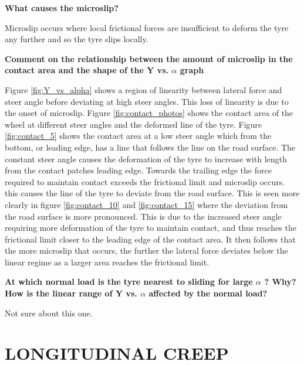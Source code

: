 \documentclass{article}
\begin{document}
\begin{center}
    \textbf{What causes the microslip?}
\end{center}
Microslip occurs where local frictional forces are insufficient to deform the tyre any further and so the tyre slips locally.

\begin{center}
    \textbf{Comment on the relationship between the amount of microslip in the contact area and
    the shape of the Y vs. $ \alpha $ graph}
\end{center}

Figure \ref{fig:Y_vs_alpha} shows a region of linearity between lateral force and steer angle before deviating at high steer angles.
This loss of linearity is due to the onset of microslip.
Figure \ref{fig:contact_photos} shows the contact area of the wheel at different steer angles and the deformed line of the tyre. %
Figure \ref{fig:contact_5} shows the contact area at a low steer angle which from the bottom, or leading edge, has a line that follows the line on the road surface.
The constant steer angle causes the deformation of the tyre to increase with length from the contact patches leading edge.
Towards the trailing edge the force required to maintain contact exceeds the frictional limit and microslip occurs.
this causes the line of the tyre to deviate from the road surface.
This is seen more clearly in figure \ref{fig:contact_10} and \ref{fig:contact_15} where the deviation from the road surface is more pronounced.
This is due to the increased steer angle requiring more deformation of the tyre to maintain contact, and thus reaches the frictional limit closer to the leading edge of the contact area.
It then follows that the more microslip that occurs, the further the lateral force deviates below the linear regime as a larger area reaches the frictional limit.

\begin{center}
    \textbf{At which normal load is the tyre nearest to sliding for large
    $ \alpha $ ? Why? How is the
    linear range of Y vs.
    $ \alpha $ affected by the normal load?}
\end{center}

Not sure about this one.

\section{LONGITUDINAL CREEP}
\end{document}
